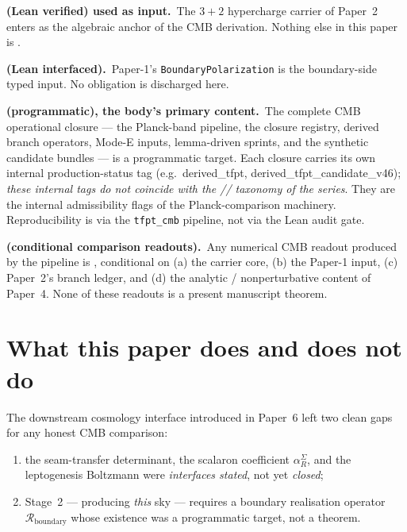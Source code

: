 \begin{tfptstatusbox}
\textbf{ (Lean verified) used as input.}\ The $3+2$
hypercharge carrier of Paper~2 enters as the algebraic
anchor of the CMB derivation. Nothing else in this paper
is .

\smallskip
\textbf{ (Lean interfaced).}\ Paper-1's
\texttt{BoundaryPolarization} is the boundary-side typed
input. No  obligation is discharged here.

\smallskip
\textbf{ (programmatic), the body's primary content.}\
The complete CMB operational closure --- the Planck-band
pipeline, the closure registry, derived branch operators,
Mode-E inputs, lemma-driven sprints, and the synthetic
candidate bundles --- is a  programmatic target.
Each closure carries its own internal production-status tag
(e.g.\ \textsf{derived\_tfpt},
\textsf{derived\_tfpt\_candidate\_v46}); \emph{these internal
tags do not coincide with the //
taxonomy of the series}. They are the internal admissibility
flags of the Planck-comparison machinery. Reproducibility is
via the \texttt{tfpt\_cmb} pipeline, not via the Lean audit
gate.

\smallskip
\textbf{ (conditional comparison readouts).}\ Any
numerical CMB readout produced by the pipeline is ,
conditional on (a) the  carrier core, (b) the
 Paper-1 input, (c) Paper~2's  branch ledger,
and (d) the analytic / nonperturbative \stag{C} content of
Paper~4. None of these readouts is a present manuscript
theorem.
\end{tfptstatusbox}

\tableofcontents

\section{What this paper does and does not do}
\label{sec:what}

The downstream cosmology interface introduced in Paper~6 left two clean
gaps for any honest CMB comparison:
\begin{enumerate}[leftmargin=1.4em]
\item the seam-transfer determinant, the scalaron coefficient
\(\alpha_R^\Sigma\), and the leptogenesis Boltzmann were
\emph{interfaces stated}, not yet \emph{closed};
\item Stage~2 --- producing \emph{this} sky --- requires a boundary
realisation operator \(\mathcal R_{\mathrm{boundary}}\) whose existence
was a programmatic target, not a theorem.
\end{enumerate}

